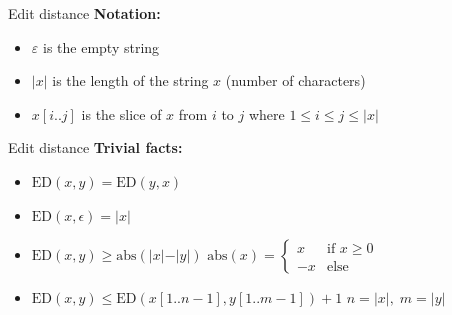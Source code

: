 
\begin{frame}{Edit distance}
  \textbf{Notation:}
  \begin{itemize}
    \item<2->
      $\varepsilon$ is the empty string
    \item<3->
      $\vert x \vert$ is the length of the string $x$ (number of characters)
    \item<5->
      $x[i..j]$ is the slice of $x$ from $i$ to $j$ where
      $1 \leq i \leq j \leq \vert x \vert$
  \end{itemize}
  \begin{figure}[!h]
    \begin{adjustbox}{width=0.75\linewidth}
      
    \end{adjustbox}
  \end{figure}
\end{frame}


\begin{frame}{Edit distance}
  \textbf{Trivial facts:}
  \begin{itemize}
    \item<2->
      $\mathrm{ED}(x, y) = \mathrm{ED}(y, x)$
    \item<3->
      $\mathrm{ED}(x, \epsilon) = \vert x \vert$
    \item<4->
      $\mathrm{ED}(x, y) \geq \mathrm{abs}(\vert x \vert - \vert y \vert)$
      \hfill
      $\mathrm{abs}(x) = \begin{cases}
        x & \text{if } x \geq 0\\
        -x & \text{else}
      \end{cases}$
    \item<5->
      $\mathrm{ED}(x, y) \leq \mathrm{ED}(x[1..n-1], y[1..m-1]) + 1$
      \hfill
      $n = \vert x \vert, \; m = \vert y \vert$
  \end{itemize}
\end{frame}


